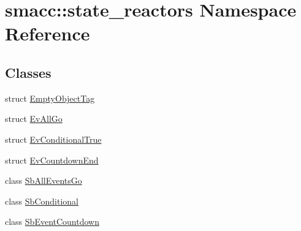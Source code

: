 \hypertarget{namespacesmacc_1_1state__reactors}{}\section{smacc\+:\+:state\+\_\+reactors Namespace Reference}
\label{namespacesmacc_1_1state__reactors}
\subsection*{Classes}
\begin{DoxyCompactItemize}
\item 
struct \hyperlink{structsmacc_1_1state__reactors_1_1EmptyObjectTag}{Empty\+Object\+Tag}
\item 
struct \hyperlink{structsmacc_1_1state__reactors_1_1EvAllGo}{Ev\+All\+Go}
\item 
struct \hyperlink{structsmacc_1_1state__reactors_1_1EvConditionalTrue}{Ev\+Conditional\+True}
\item 
struct \hyperlink{structsmacc_1_1state__reactors_1_1EvCountdownEnd}{Ev\+Countdown\+End}
\item 
class \hyperlink{classsmacc_1_1state__reactors_1_1SbAllEventsGo}{Sb\+All\+Events\+Go}
\item 
class \hyperlink{classsmacc_1_1state__reactors_1_1SbConditional}{Sb\+Conditional}
\item 
class \hyperlink{classsmacc_1_1state__reactors_1_1SbEventCountdown}{Sb\+Event\+Countdown}
\end{DoxyCompactItemize}
